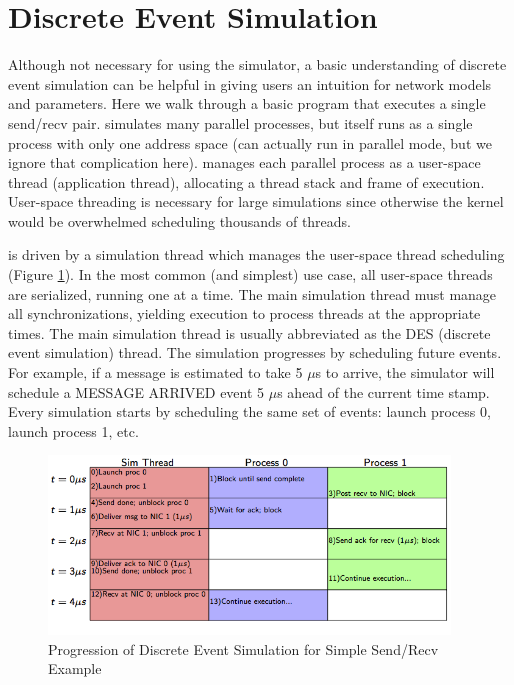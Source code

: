 
\section{Discrete Event Simulation}
\label{sec:tutorial:des}
Although not necessary for using the simulator, a basic understanding of discrete event simulation can be helpful in giving users an intuition for network models and parameters.
Here we walk through a basic program that executes a single send/recv pair.
\sstmacro simulates many parallel processes, but itself runs as a single process with only one address space (\sstmacro can actually run in parallel mode, but we ignore that complication here).
\sstmacro manages each parallel process as a user-space thread (application thread), allocating a thread stack and frame of execution.
User-space threading is necessary for large simulations since otherwise the kernel would be overwhelmed scheduling thousands of threads.

\sstmacro is driven by a simulation thread which manages the user-space thread scheduling (Figure \ref{fig:des}).
In the most common (and simplest) use case, all user-space threads are serialized, running one at a time.
The main simulation thread must manage all synchronizations, yielding execution to process threads at the appropriate times.
The main simulation thread is usually abbreviated as the DES (discrete event simulation) thread.
The simulation progresses by scheduling future events.
For example, if a message is estimated to take 5 $\mu$s to arrive,
the simulator will schedule a MESSAGE ARRIVED event 5 $\mu$s ahead of the current time stamp.
Every simulation starts by scheduling the same set of events: launch process 0, launch process 1, etc.

\begin{figure}[h!]
\centering
\includegraphics[width=0.95\textwidth]{figures/tikz/des/events.png}
\caption{Progression of Discrete Event Simulation for Simple Send/Recv Example}
\label{fig:des}
\end{figure}

